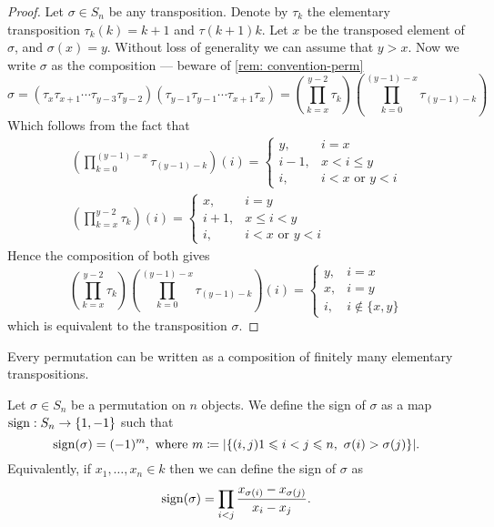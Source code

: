 \begin{proof}
Let \(\sigma \in S_n\) be any transposition. Denote by \(\tau_k\) the
elementary transposition \(\tau_k(k) = k + 1\) and \(\tau(k + 1) k\). Let
\(x\) be the transposed element of \(\sigma\), and \(\sigma(x) = y\). Without
loss of generality we can assume that \(y > x\). Now we write \(\sigma\) as
the composition --- beware of \cref{rem: convention-perm}
\[
  \sigma = \left(\tau_x \tau_{x + 1} \cdots \tau_{y - 3} \tau_{y - 2} \right)
  \left( \tau_{y - 1} \tau_{y - 1} \cdots \tau_{x + 1} \tau_{x} \right)
  = \left( \prod_{k = x}^{y-2} \tau_k \right)
  \left( \prod_{k = 0}^{(y - 1) - x} \tau_{(y-1) - k} \right)
\]
Which follows from the fact that
\begin{gather*}
  \left( \prod_{k = 0}^{(y - 1) - x} \tau_{(y-1) - k} \right)(i) =
  \begin{cases}
    y, &i = x \\
    i - 1, &x < i \leq y \\
    i, &i < x \text{ or } y < i
  \end{cases}
  \\
  \left( \prod_{k = x}^{y-2} \tau_k \right)(i) =
  \begin{cases}
    x, &i = y \\
    i + 1, &x \leq i < y \\
    i, &i < x \text{ or } y < i
  \end{cases}
\end{gather*}
Hence the composition of both gives
\[
  \left( \prod_{k = x}^{y-2} \tau_k \right)
  \left( \prod_{k = 0}^{(y - 1) - x} \tau_{(y-1) - k} \right)(i) =
  \begin{cases}
    y, &i = x \\
    x, &i = y \\
    i, &i \not\in \{x, y\}
  \end{cases}
\]
which is equivalent to the transposition \(\sigma\).
\end{proof}

\begin{corollary}
Every permutation can be written as a composition of finitely many elementary
transpositions.
\end{corollary}

\begin{definition}[Sign]
\label{def: sign}
Let \(\sigma \in S_n\) be a permutation on \(n\) objects. We define
the sign of \(\sigma\) as a map \(\operatorname{sign}: S_n \to
\{1, -1\}\) such that
\[
  \operatorname{sign}(\sigma) = (-1)^m, \text{ where }
  m \coloneq |\{(i, j) \relax 1 \leqslant i < j \leqslant n,\ \sigma(i) > \sigma(j)\}|.
\]
Equivalently, if \(x_1, \dots, x_n \in k\) then we can define the
sign of \(\sigma\) as
\[
  \operatorname{sign}(\sigma) = \prod_{i < j} \frac{x_{\sigma(i)} -
  x_{\sigma(j)}}{x_i - x_j}.
\]
\end{definition}

